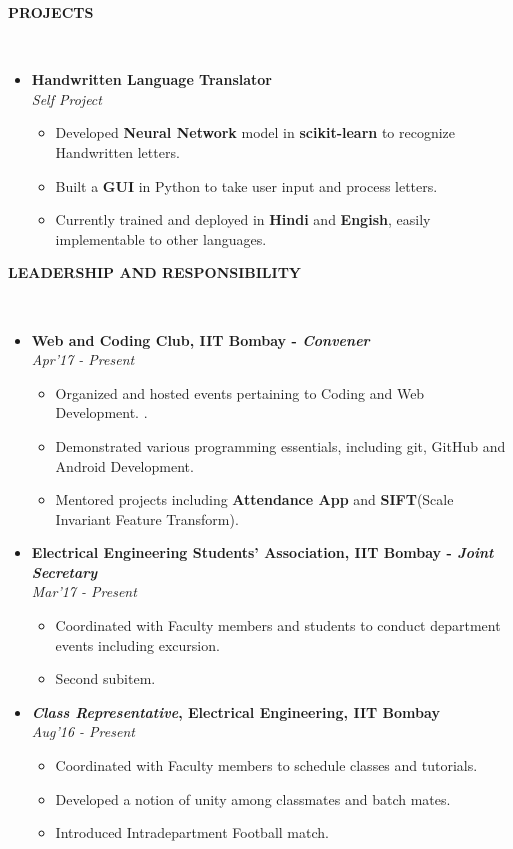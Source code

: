 \documentclass[a4paper,10pt]{article}
\newcommand{\isep}{-2 pt}
\newcommand{\lsep}{-0.5cm}
\newcommand{\resheading}[1]{{\small \colorbox{mygrey}{\begin{minipage}{0.975\textwidth}{\textbf{#1 \vphantom{p\^{E}}}}\end{minipage}}}}
\begin{document}
\resheading{\textbf{PROJECTS} }\\[\lsep]
\begin{itemize}
\item  \textbf{Handwritten Language Translator} \\
 \emph{Self Project}
 \begin{itemize}\itemsep \isep
 \item Developed \textbf{Neural Network} model in \textbf{scikit-learn} to recognize Handwritten letters.
 \item Built a \textbf{GUI} in Python to take user input and process letters.
 \item Currently trained and deployed in \textbf{Hindi} and \textbf{Engish}, easily implementable to other languages.
 \end{itemize}
\end{itemize}

\resheading{\textbf{LEADERSHIP AND RESPONSIBILITY} }\\[\lsep]
\begin{itemize}
\item \textbf{Web and Coding Club, IIT Bombay - \emph{Convener} 
}  \\
 \emph{Apr'17 - Present} \\[-0.6cm]
	\begin{itemize}\itemsep \isep
	\item Organized and hosted events pertaining to Coding and Web Development.
.
	\item Demonstrated various programming essentials, including git, GitHub and Android Development.

	\item Mentored projects including \textbf{Attendance App} and \textbf{SIFT}(Scale Invariant Feature Transform).

	\end{itemize}

\item \textbf{Electrical Engineering Students' Association, IIT Bombay - \emph{Joint Secretary}
}  \\
 \emph{ Mar'17 - Present} \\[-0.6cm]
	\begin{itemize}\itemsep \isep
	\item Coordinated with Faculty members and students to conduct department events including excursion.
	\item Second subitem.
	\end{itemize}

\item \textbf{\emph{Class Representative}, Electrical Engineering, IIT Bombay
}  \\
 \emph{ Aug'16 - Present} \\[-0.6cm]
	\begin{itemize}\itemsep \isep
	\item Coordinated with Faculty members to schedule classes and tutorials.
	\item Developed a notion of unity among classmates and batch mates.
	\item Introduced Intradepartment Football match.
	\end{itemize}
\end{itemize}
\end{document}
